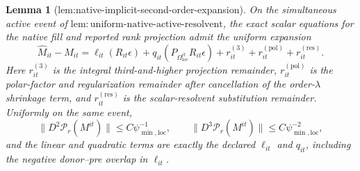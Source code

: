 \documentclass{article}
\newtheorem{lemma}{Lemma}
\begin{document}
\begin{lemma}[lem:native-implicit-second-order-expansion]\label{lem:native-implicit-second-order-expansion}
On the simultaneous active event of \(\mathrm{lem:uniform\mbox{-}native\mbox{-}active\mbox{-}resolvent}\), the exact scalar equations for the native fill and reported rank projection admit the uniform expansion
\[
 \widehat M_{it}-M_{it}
 =\ell_{it}(R_{it}\epsilon)
  +q_{it}(P_{\Omega_{\mathrm{loc}}^{it}}R_{it}\epsilon)
  +r^{(3)}_{it}+r^{(\mathrm{pol})}_{it}+r^{(\mathrm{res})}_{it}.
\]
Here \(r^{(3)}_{it}\) is the integral third-and-higher projection remainder, \(r^{(\mathrm{pol})}_{it}\) is the polar-factor and regularization remainder after cancellation of the order-\(\lambda\) shrinkage term, and \(r^{(\mathrm{res})}_{it}\) is the scalar-resolvent substitution remainder. Uniformly on the same event,
\[
 \|D^2\mathcal P_r(M^{it})\|\le C\psi_{\min,\mathrm{loc}}^{-1},
 \qquad
 \|D^3\mathcal P_r(M^{it})\|\le C\psi_{\min,\mathrm{loc}}^{-2},
\]
and the linear and quadratic terms are exactly the declared \(\ell_{it}\) and \(q_{it}\), including the negative donor--pre overlap in \(\ell_{it}\).
\end{lemma}
\end{document}
